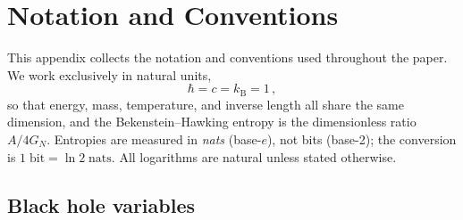 \documentclass[11pt,letterpaper]{article}
\theoremstyle{plain}
\theoremstyle{definition}
\theoremstyle{remark}
\begin{document}
\appendix

\section{Notation and Conventions}
\label{app:notation}

This appendix collects the notation and conventions used throughout the paper.
We work exclusively in natural units,
\begin{equation}
  \hbar = c = k_{\mathrm{B}} = 1\,,
  \label{eq16:natural_units}
\end{equation}
so that energy, mass, temperature, and inverse length all share the same
dimension, and the Bekenstein--Hawking entropy is the dimensionless ratio
$A/4G_N$.  Entropies are measured in \emph{nats} (base-$e$), not bits (base-2);
the conversion is $1\;\text{bit} = \ln 2\;\text{nats}$.  All logarithms are
natural unless stated otherwise.

\subsection{Black hole variables}
\end{document}
